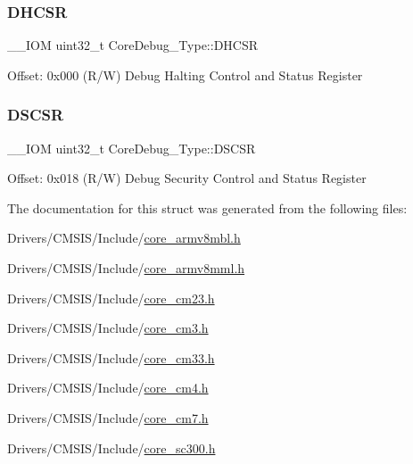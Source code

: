 \subsubsection{\texorpdfstring{D\+H\+C\+SR}{DHCSR}}
{\footnotesize\ttfamily \+\_\+\+\_\+\+I\+OM uint32\+\_\+t Core\+Debug\+\_\+\+Type\+::\+D\+H\+C\+SR}

Offset\+: 0x000 (R/W) Debug Halting Control and Status Register \mbox{\label{struct_core_debug___type_ad9fa5e915e038e20b9be88d54d432fb8}} 
\subsubsection{\texorpdfstring{D\+S\+C\+SR}{DSCSR}}
{\footnotesize\ttfamily \+\_\+\+\_\+\+I\+OM uint32\+\_\+t Core\+Debug\+\_\+\+Type\+::\+D\+S\+C\+SR}

Offset\+: 0x018 (R/W) Debug Security Control and Status Register 

The documentation for this struct was generated from the following files\+:\begin{DoxyCompactItemize}
\item 
Drivers/\+C\+M\+S\+I\+S/\+Include/\hyperlink{core__armv8mbl_8h}{core\+\_\+armv8mbl.\+h}\item 
Drivers/\+C\+M\+S\+I\+S/\+Include/\hyperlink{core__armv8mml_8h}{core\+\_\+armv8mml.\+h}\item 
Drivers/\+C\+M\+S\+I\+S/\+Include/\hyperlink{core__cm23_8h}{core\+\_\+cm23.\+h}\item 
Drivers/\+C\+M\+S\+I\+S/\+Include/\hyperlink{core__cm3_8h}{core\+\_\+cm3.\+h}\item 
Drivers/\+C\+M\+S\+I\+S/\+Include/\hyperlink{core__cm33_8h}{core\+\_\+cm33.\+h}\item 
Drivers/\+C\+M\+S\+I\+S/\+Include/\hyperlink{core__cm4_8h}{core\+\_\+cm4.\+h}\item 
Drivers/\+C\+M\+S\+I\+S/\+Include/\hyperlink{core__cm7_8h}{core\+\_\+cm7.\+h}\item 
Drivers/\+C\+M\+S\+I\+S/\+Include/\hyperlink{core__sc300_8h}{core\+\_\+sc300.\+h}\end{DoxyCompactItemize}
